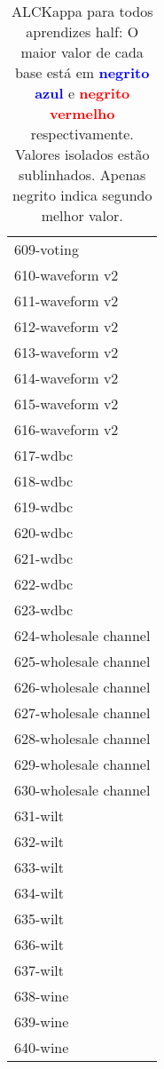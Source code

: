 \begin{table}[h]
\caption{ALCKappa para todos aprendizes half: O maior valor de cada base está em \textcolor{blue}{\textbf{negrito azul}} e \textcolor{red}{\textbf{negrito vermelho}} respectivamente. Valores isolados estão sublinhados. Apenas negrito indica segundo melhor valor.}
\begin{center}\begin{tabular}{l}
 & \\ \hline 609-voting &  \\
610-waveform v2 &  \\
611-waveform v2 &  \\
612-waveform v2 &  \\
613-waveform v2 &  \\
614-waveform v2 &  \\
615-waveform v2 &  \\ \hline
616-waveform v2 &  \\
617-wdbc &  \\
618-wdbc &  \\
619-wdbc &  \\
620-wdbc &  \\
621-wdbc &  \\
622-wdbc &  \\ \hline
623-wdbc &  \\
624-wholesale channel &  \\
625-wholesale channel &  \\
626-wholesale channel &  \\
627-wholesale channel &  \\
628-wholesale channel &  \\
629-wholesale channel &  \\ \hline
630-wholesale channel &  \\
631-wilt &  \\
632-wilt &  \\
633-wilt &  \\
634-wilt &  \\
635-wilt &  \\
636-wilt &  \\ \hline
637-wilt &  \\
638-wine &  \\
639-wine &  \\
640-wine &  \\\end{tabular}\label{stratsALCKappa19AllReduxb}
\end{center}
\end{table}
